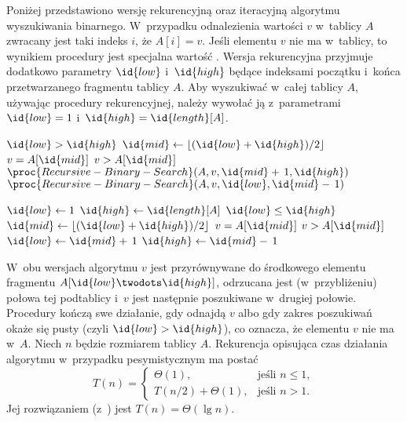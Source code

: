 Poniżej przedstawiono wersję rekurencyjną oraz iteracyjną algorytmu wyszukiwania binarnego. W~przypadku odnalezienia wartości $v$ w~tablicy $A$ zwracany jest taki indeks $i$, że $A[i]=v$. Jeśli elementu $v$ nie ma w~tablicy, to wynikiem procedury jest specjalna wartość . Wersja rekurencyjna przyjmuje dodatkowo parametry $\id{low}$ i~$\id{high}$ będące indeksami początku i~końca przetwarzanego fragmentu tablicy $A$. Aby wyszukiwać w~całej tablicy $A$, używając procedury rekurencyjnej, należy wywołać ją z~parametrami $\id{low}=1$ i~$\id{high}=\id{length}[A]$.

\begin{codebox}
\li	\If $\id{low}>\id{high}$
\li		\Then \Return {}
		\End
\li	$\id{mid}\gets\lfloor(\id{low}+\id{high})/2\rfloor$
\li	\If $v=A[\id{mid}]$
\li		\Then \Return {}
		\End
\li	\If $v>A[\id{mid}]$
\li		\Then \Return $\proc{Recursive-Binary-Search}(A,v,\id{mid}+\,1,\id{high})$
\li		\Else \Return $\proc{Recursive-Binary-Search}(A,v,\id{low},\id{mid}-\,1)$
		\End
\end{codebox}

\begin{codebox}
\li	$\id{low}\gets1$
\li	$\id{high}\gets\id{length}[A]$
\li	\While $\id{low}\le\id{high}$
\li		\Do
			$\id{mid}\gets\lfloor(\id{low}+\id{high})/2\rfloor$
\li			\If $v=A[\id{mid}]$
\li				\Then \Return {}
				\End
\li			\If $v>A[\id{mid}]$
\li				\Then $\id{low}\gets\id{mid}+\,1$
\li				\Else $\id{high}\gets\id{mid}-\,1$
				\End
		\End
\li	\Return {}
\end{codebox}

W~obu wersjach algorytmu  $v$ jest przyrównywane do środkowego elementu fragmentu $A[\id{low}\twodots\id{high}]$, odrzucana jest (w~przybliżeniu) połowa tej podtablicy i~$v$ jest następnie poszukiwane w~drugiej połowie. Procedury kończą swe działanie, gdy odnajdą $v$ albo gdy zakres poszukiwań okaże się pusty (czyli $\id{low}>\id{high}$), co oznacza, że elementu $v$ nie ma w~$A$. Niech $n$ będzie rozmiarem tablicy $A$. Rekurencja opisująca czas działania algorytmu w~przypadku pesymistycznym ma postać
\[
	T(n) =
	\begin{cases}
		\Theta(1), & \text{jeśli $n\le1$}, \\
		T(n/2)+\Theta(1), & \text{jeśli $n>1$}.
	\end{cases}
\]
Jej rozwiązaniem (z~) jest $T(n)=\Theta(\lg n)$.

